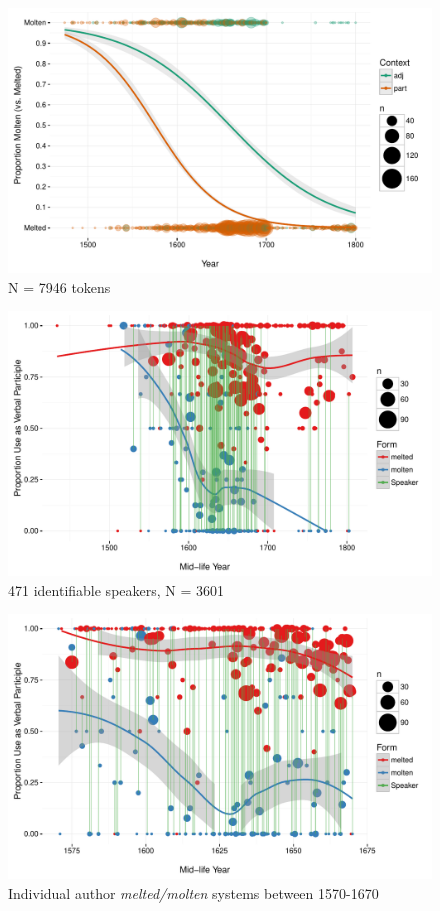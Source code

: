 \documentclass{artikel3}
\begin{document}
\begin{figure}
    \begin{center}
    \includegraphics[scale=.6]{FormByDateUnbinnedWithDots2.pdf}
    \caption{N =  7946 tokens}
       \label{molten2}
    \end{center}
\end{figure}

\begin{figure}
    \begin{center}
    \includegraphics[scale=.6]{ContextByDateAuthor.pdf}
    \caption{471 identifiable speakers, N = 3601}
       \label{molten3}
    \end{center}
\end{figure}

\begin{figure}
    \begin{center}
    \includegraphics[scale=.6]{ContextByDateAuthor1570.pdf}
    \caption{Individual author \textsl{melted/molten} systems between 1570-1670}
       \label{molten4}
    \end{center}
\end{figure}
\end{document}
